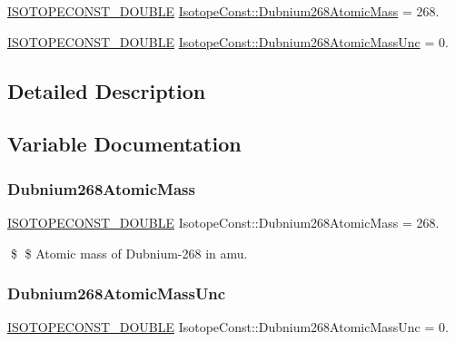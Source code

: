 \begin{DoxyCompactItemize}
\item 
\mbox{\hyperlink{group___isotope_const-_macros_ga8f45a7272ce02c0b4c65c44636ed719a}{I\+S\+O\+T\+O\+P\+E\+C\+O\+N\+S\+T\+\_\+\+D\+O\+U\+B\+LE}} \mbox{\hyperlink{group___isotope_const-_dubnium-_db268_ga76d66fdd3f3608e55ecda4e2273def5f}{Isotope\+Const\+::\+Dubnium268\+Atomic\+Mass}} = 268.
\item 
\mbox{\hyperlink{group___isotope_const-_macros_ga8f45a7272ce02c0b4c65c44636ed719a}{I\+S\+O\+T\+O\+P\+E\+C\+O\+N\+S\+T\+\_\+\+D\+O\+U\+B\+LE}} \mbox{\hyperlink{group___isotope_const-_dubnium-_db268_ga8da72e4cc53f3f12f5e0f11f8d8f0ea0}{Isotope\+Const\+::\+Dubnium268\+Atomic\+Mass\+Unc}} = 0.
\end{DoxyCompactItemize}


\subsection{Detailed Description}


\subsection{Variable Documentation}
\mbox{\label{group___isotope_const-_dubnium-_db268_ga76d66fdd3f3608e55ecda4e2273def5f}} 
\subsubsection{\texorpdfstring{Dubnium268\+Atomic\+Mass}{Dubnium268AtomicMass}}
{\footnotesize\ttfamily \mbox{\hyperlink{group___isotope_const-_macros_ga8f45a7272ce02c0b4c65c44636ed719a}{I\+S\+O\+T\+O\+P\+E\+C\+O\+N\+S\+T\+\_\+\+D\+O\+U\+B\+LE}} Isotope\+Const\+::\+Dubnium268\+Atomic\+Mass = 268.}

\$ \$ Atomic mass of Dubnium-\/268 in amu. \mbox{\label{group___isotope_const-_dubnium-_db268_ga8da72e4cc53f3f12f5e0f11f8d8f0ea0}} 
\subsubsection{\texorpdfstring{Dubnium268\+Atomic\+Mass\+Unc}{Dubnium268AtomicMassUnc}}
{\footnotesize\ttfamily \mbox{\hyperlink{group___isotope_const-_macros_ga8f45a7272ce02c0b4c65c44636ed719a}{I\+S\+O\+T\+O\+P\+E\+C\+O\+N\+S\+T\+\_\+\+D\+O\+U\+B\+LE}} Isotope\+Const\+::\+Dubnium268\+Atomic\+Mass\+Unc = 0.}

